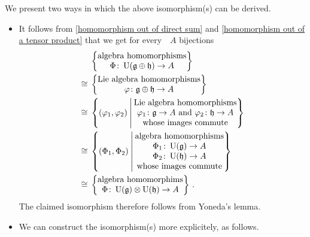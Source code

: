 \begin{example}
  We present two ways in which the above isomorphism(s) can be derived.
  \begin{itemize}
    \item
      It follows from \cref{homomorphism out of direct sum} and \cref{homomorphism out of a tensor product} that we get for every~\algebra{$\kf$}~$A$ bijections
      \begin{align*}
        {}&
        \left\{
          \begin{tabular}{@{}c@{}}
            algebra homomorphisms \\
            $\Phi \colon \Univ(\glie \oplus \hlie) \to A$
          \end{tabular}
        \right\}
        \\
        \cong{}&
        \left\{
          \begin{tabular}{@{}c@{}}
            Lie~algebra homomorphisms \\
            $\varphi \colon \glie \oplus \hlie \to A$
          \end{tabular}
        \right\}
        \\
        \cong{}&
        \left\{
          ( \varphi_1, \varphi_2 )
        \suchthat*
          \begin{tabular}{@{}c@{}}
            Lie~algebra homomorphisms \\
            $\varphi_1 \colon \glie \to A$ and~$\varphi_2 \colon \hlie \to A$ \\
            whose images commute
          \end{tabular}
        \right\}
        \\
        \cong{}&
        \left\{
          (\Phi_1, \Phi_2)
        \suchthat*
          \begin{tabular}{@{}c@{}}
            algebra homomorphisms               \\
            $\Phi_1 \colon \Univ(\glie) \to A$  \\
            $\Phi_2 \colon \Univ(\hlie) \to A$  \\
            whose images commute
          \end{tabular}
        \right\}
        \\
        \cong{}&
        \left\{
          \begin{tabular}{@{}c@{}}
             algebra homomorphims \\
             $\Phi \colon \Univ(\glie) \tensor \Univ(\hlie) \to A$
          \end{tabular}
        \right\} \,.
      \end{align*}
      The claimed isomorphism therefore follows from Yoneda’s lemma.
    \item
      We can construct the isomorphism(s) more explicitely, as follows.


\end{itemize}
\end{example}
